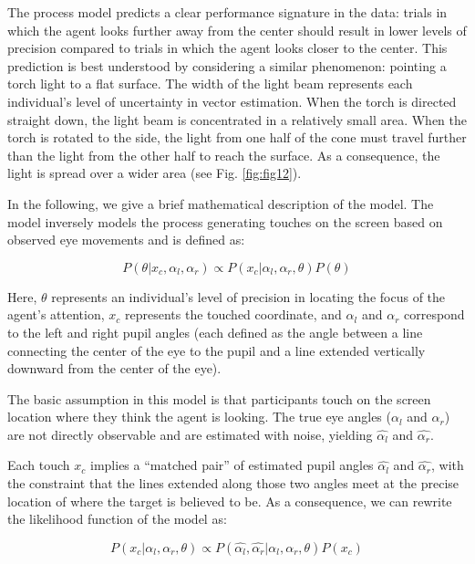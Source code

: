 \documentclass[
  man,floatsintext]{apa7}
\begin{document}
The process model predicts a clear performance signature in the data: trials in which the agent looks further away from the center should result in lower levels of precision compared to trials in which the agent looks closer to the center. This prediction is best understood by considering a similar phenomenon: pointing a torch light to a flat surface. The width of the light beam represents each individual's level of uncertainty in vector estimation. When the torch is directed straight down, the light beam is concentrated in a relatively small area. When the torch is rotated to the side, the light from one half of the cone must travel further than the light from the other half to reach the surface. As a consequence, the light is spread over a wider area (see Fig. \ref{fig:fig12}).

In the following, we give a brief mathematical description of the model. The model inversely models the process generating touches on the screen based on observed eye movements and is defined as:

\begin{equation}
    P(\theta | x_c, \alpha_l, \alpha_r) \propto P(x_c | \alpha_l, \alpha_r, \theta)P(\theta)
\end{equation}

Here, \(\theta\) represents an individual's level of precision in locating the focus of the agent's attention, \(x_c\) represents the touched coordinate, and \(\alpha_l\) and \(\alpha_r\) correspond to the left and right pupil angles (each defined as the angle between a line connecting the center of the eye to the pupil and a line extended vertically downward from the center of the eye).

The basic assumption in this model is that participants touch on the screen location where they think the agent is looking. The true eye angles (\(\alpha_l\) and \(\alpha_r\)) are not directly observable and are estimated with noise, yielding \(\hat{\alpha_l}\) and \(\hat{\alpha_r}\).

Each touch \(x_c\) implies a ``matched pair'' of estimated pupil angles \(\hat{\alpha_l}\) and \(\hat{\alpha_r}\), with the constraint that the lines extended along those two angles meet at the precise location of where the target is believed to be. As a consequence, we can rewrite the likelihood function of the model as:

\begin{equation}
P(x_c | \alpha_l, \alpha_r, \theta) \propto P(\hat{\alpha_l}, \hat{\alpha_r} | \alpha_l, \alpha_r, \theta) P(x_c)
\end{equation}
\end{document}
